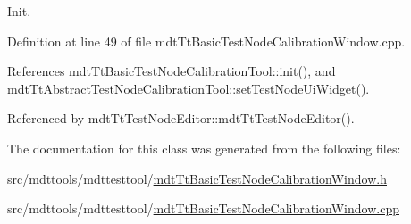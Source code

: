 Init. 



Definition at line 49 of file mdt\-Tt\-Basic\-Test\-Node\-Calibration\-Window.\-cpp.



References mdt\-Tt\-Basic\-Test\-Node\-Calibration\-Tool\-::init(), and mdt\-Tt\-Abstract\-Test\-Node\-Calibration\-Tool\-::set\-Test\-Node\-Ui\-Widget().



Referenced by mdt\-Tt\-Test\-Node\-Editor\-::mdt\-Tt\-Test\-Node\-Editor().



The documentation for this class was generated from the following files\-:\begin{DoxyCompactItemize}
\item 
src/mdttools/mdttesttool/\hyperlink{mdt_tt_basic_test_node_calibration_window_8h}{mdt\-Tt\-Basic\-Test\-Node\-Calibration\-Window.\-h}\item 
src/mdttools/mdttesttool/\hyperlink{mdt_tt_basic_test_node_calibration_window_8cpp}{mdt\-Tt\-Basic\-Test\-Node\-Calibration\-Window.\-cpp}\end{DoxyCompactItemize}
